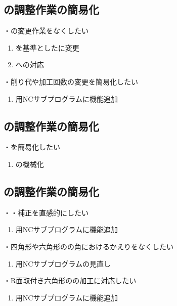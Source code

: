 \subsection{\EndFacecutMilling の調整作業の簡易化}
・\TDCorrection の変更作業をなくしたい
\begin{enumerate}[label=\sarrow]
\item \IDCenter を基準とした\EndFacecutMilling に変更
\item \ODCornerR への対応
\end{enumerate}
・削り代や加工回数の変更を簡易化したい
\begin{enumerate}[label=\sarrow]
\item \EndFacecutMilling 用NCサブプログラムに機能追加
\end{enumerate}


\subsection{\OutcutMilling の調整作業の簡易化}
・\CurvedOutcutMilling を簡易化したい
\begin{enumerate}[label=\sarrow]
\item \CurvedOutcutMilling の機械化
\end{enumerate}


\subsection{\KeywayMilling の調整作業の簡易化}
・\KeywayPos・\KeywayWidth 補正を直感的にしたい
\begin{enumerate}[label=\sarrow]
\item \KeywayMilling 用NCサブプログラムに機能追加
\end{enumerate}
・四角形や六角形の\Keyway の角におけるかえりをなくしたい
\begin{enumerate}[label=\sarrow]
\item \KeywayMilling 用NCサブプログラムの見直し
\end{enumerate}
・R面取付き六角形の\Keyway の加工に対応したい
\begin{enumerate}[label=\sarrow]
\item \KeywayMilling 用NCサブプログラムに機能追加
\end{enumerate}


